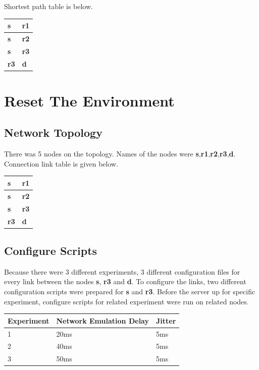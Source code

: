 \documentclass[conference]{IEEEtran}
\begin{document}
Shortest path table is below.

\begin{table}[h]
\centering
\begin{tabular}{|l|l|}
\hline
\textbf{s}  & \textbf{r1} \\ \hline
\textbf{s}  & \textbf{r2} \\ \hline
\textbf{s}  & \textbf{r3} \\ \hline
\textbf{r3} & \textbf{d}  \\ \hline
\end{tabular}
\end{table}

\section{Reset The Environment}
\subsection{Network Topology}
There was 5 nodes on the topology. Names of the nodes were \textbf{s},\textbf{r1},\textbf{r2},\textbf{r3},\textbf{d}.
Connection link table is given below.
\begin{table}[h]
\centering
\begin{tabular}{|l|l|}
\hline
\textbf{s}  & \textbf{r1} \\ \hline
\textbf{s}  & \textbf{r2} \\ \hline
\textbf{s}  & \textbf{r3} \\ \hline
\textbf{r3} & \textbf{d} \\ \hline
\end{tabular}
\end{table}

\subsection{Configure Scripts}

Because there were 3 different experiments, 3 different configuration files for every link between the nodes \textbf{s}, \textbf{r3} and \textbf{d}. To configure the links, two different configuration scripts were prepared for \textbf{s} and \textbf{r3}. Before the server up for specific experiment, configure scripts for related experiment were run on related nodes.

\begin{table}[h]
\centering
\begin{tabular}{|l|l|l|}
\hline
Experiment & Network Emulation Delay & Jitter \\ \hline
1          & 20ms                    & 5ms    \\ \hline
2          & 40ms                    & 5ms    \\ \hline
3          & 50ms                    & 5ms    \\ \hline
\end{tabular}
\end{table}
\end{document}
